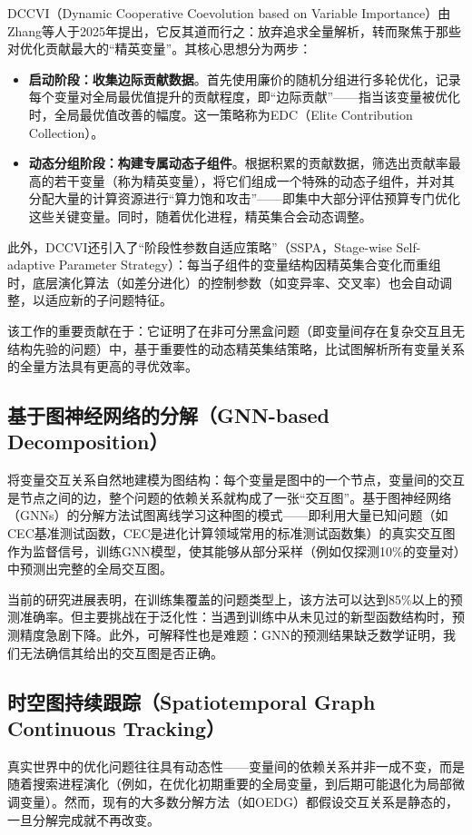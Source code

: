 DCCVI（Dynamic Cooperative Coevolution based on Variable Importance）由Zhang等人于2025年提出，它反其道而行之：放弃追求全量解析，转而聚焦于那些对优化贡献最大的“精英变量”。其核心思想分为两步：
\begin{itemize}
    \item \textbf{启动阶段：收集边际贡献数据}。首先使用廉价的随机分组进行多轮优化，记录每个变量对全局最优值提升的贡献程度，即“边际贡献”——指当该变量被优化时，全局最优值改善的幅度。这一策略称为EDC（Elite Contribution Collection）。
    \item \textbf{动态分组阶段：构建专属动态子组件}。根据积累的贡献数据，筛选出贡献率最高的若干变量（称为精英变量），将它们组成一个特殊的动态子组件，并对其分配大量的计算资源进行“算力饱和攻击”——即集中大部分评估预算专门优化这些关键变量。同时，随着优化进程，精英集合会动态调整。
\end{itemize}
此外，DCCVI还引入了“阶段性参数自适应策略”（SSPA，Stage-wise Self-adaptive Parameter Strategy）：每当子组件的变量结构因精英集合变化而重组时，底层演化算法（如差分进化）的控制参数（如变异率、交叉率）也会自动调整，以适应新的子问题特征。

该工作的重要贡献在于：它证明了在非可分黑盒问题（即变量间存在复杂交互且无结构先验的问题）中，基于重要性的动态精英集结策略，比试图解析所有变量关系的全量方法具有更高的寻优效率。

\subsection{基于图神经网络的分解（GNN-based Decomposition）}
将变量交互关系自然地建模为图结构：每个变量是图中的一个节点，变量间的交互是节点之间的边，整个问题的依赖关系就构成了一张“交互图”。基于图神经网络（GNNs）的分解方法试图离线学习这种图的模式——即利用大量已知问题（如CEC基准测试函数，CEC是进化计算领域常用的标准测试函数集）的真实交互图作为监督信号，训练GNN模型，使其能够从部分采样（例如仅探测10\%的变量对）中预测出完整的全局交互图。

当前的研究进展表明，在训练集覆盖的问题类型上，该方法可以达到85\%以上的预测准确率。但主要挑战在于泛化性：当遇到训练中从未见过的新型函数结构时，预测精度急剧下降。此外，可解释性也是难题：GNN的预测结果缺乏数学证明，我们无法确信其给出的交互图是否正确。

\subsection{时空图持续跟踪（Spatiotemporal Graph Continuous Tracking）}
真实世界中的优化问题往往具有动态性——变量间的依赖关系并非一成不变，而是随着搜索进程演化（例如，在优化初期重要的全局变量，到后期可能退化为局部微调变量）。然而，现有的大多数分解方法（如OEDG）都假设交互关系是静态的，一旦分解完成就不再改变。

